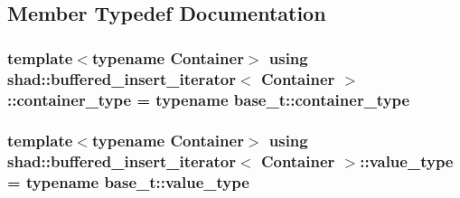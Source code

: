\subsection{Member Typedef Documentation}
\hypertarget{classshad_1_1buffered__insert__iterator_a901a53d64a76930ad281a96045f31a01}{
\subsubsection[{container\-\_\-type}]{\setlength{\rightskip}{0pt plus 5cm}template$<$typename Container$>$ using {\bf shad\-::buffered\-\_\-insert\-\_\-iterator}$<$ Container $>$\-::{\bf container\-\_\-type} =  typename {\bf base\-\_\-t\-::container\-\_\-type}}}\label{classshad_1_1buffered__insert__iterator_a901a53d64a76930ad281a96045f31a01}
\hypertarget{classshad_1_1buffered__insert__iterator_ad7078b8c4295fb93910b095bdee49d14}{
\subsubsection[{value\-\_\-type}]{\setlength{\rightskip}{0pt plus 5cm}template$<$typename Container$>$ using {\bf shad\-::buffered\-\_\-insert\-\_\-iterator}$<$ Container $>$\-::{\bf value\-\_\-type} =  typename {\bf base\-\_\-t\-::value\-\_\-type}}}\label{classshad_1_1buffered__insert__iterator_ad7078b8c4295fb93910b095bdee49d14}


